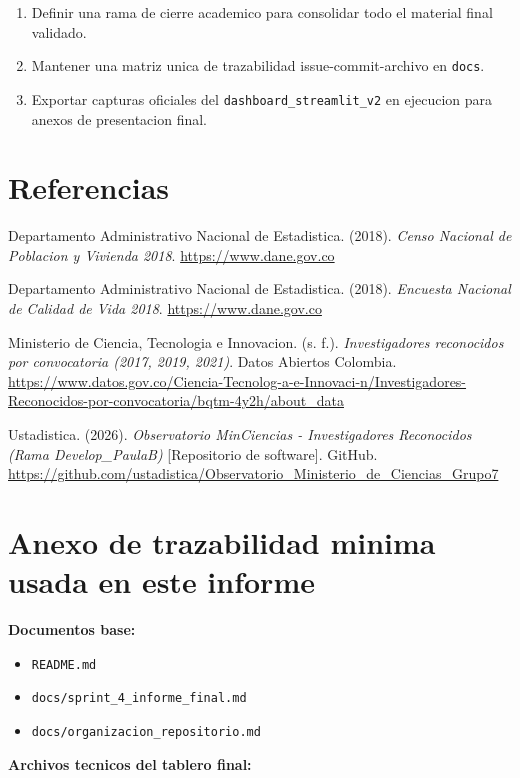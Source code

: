\documentclass[12pt,letterpaper]{article}
\begin{document}
\begin{enumerate}[label=\arabic*.]
    \item Definir una rama de cierre academico para consolidar todo el material final validado.
    \item Mantener una matriz unica de trazabilidad issue-commit-archivo en \texttt{docs}.
    \item Exportar capturas oficiales del \texttt{dashboard\_streamlit\_v2} en ejecucion para anexos de presentacion final.
\end{enumerate}

\section{Referencias}

Departamento Administrativo Nacional de Estadistica. (2018). \textit{Censo Nacional de Poblacion y Vivienda 2018}. \url{https://www.dane.gov.co}

Departamento Administrativo Nacional de Estadistica. (2018). \textit{Encuesta Nacional de Calidad de Vida 2018}. \url{https://www.dane.gov.co}

Ministerio de Ciencia, Tecnologia e Innovacion. (s. f.). \textit{Investigadores reconocidos por convocatoria (2017, 2019, 2021)}. Datos Abiertos Colombia. \url{https://www.datos.gov.co/Ciencia-Tecnolog-a-e-Innovaci-n/Investigadores-Reconocidos-por-convocatoria/bqtm-4y2h/about_data}

Ustadistica. (2026). \textit{Observatorio MinCiencias - Investigadores Reconocidos (Rama Develop\_PaulaB)} [Repositorio de software]. GitHub. \url{https://github.com/ustadistica/Observatorio_Ministerio_de_Ciencias_Grupo7}

\section{Anexo de trazabilidad minima usada en este informe}

\textbf{Documentos base:}

\begin{itemize}
    \item \texttt{README.md}
    \item \texttt{docs/sprint\_4\_informe\_final.md}
    \item \texttt{docs/organizacion\_repositorio.md}
\end{itemize}

\textbf{Archivos tecnicos del tablero final:}
\end{document}
